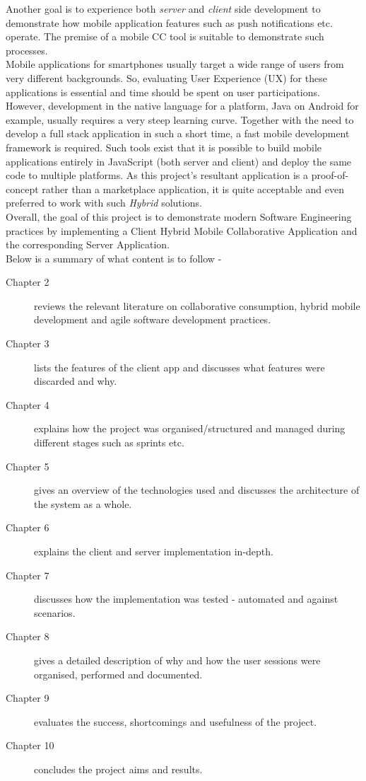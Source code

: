 Another goal is to experience both \textit{server} and \textit{client} side development to demonstrate how mobile application features such as push notifications etc. operate. The premise of a mobile CC tool is suitable to demonstrate such processes.\\

Mobile applications for smartphones usually target a wide range of users from very different backgrounds. So, evaluating User Experience (UX) for these applications is essential and time should be spent on user participations. However, development in the native language for a platform, Java on Android for example, usually requires a very steep learning curve. Together with the need to develop a full stack application in such a short time, a fast mobile development framework is required. Such tools exist that it is possible to build mobile applications entirely in JavaScript (both server and client) and deploy the same code to multiple platforms. As this project's resultant application is a proof-of-concept rather than a marketplace application, it is quite acceptable and even preferred to work with such \textit{Hybrid} solutions.\\

Overall, the goal of this project is to demonstrate modern Software Engineering practices by implementing a Client Hybrid Mobile Collaborative Application and the corresponding Server Application.\\

Below is a summary of what content is to follow -

\begin{description}
	\item [Chapter 2] reviews the relevant literature on collaborative consumption, hybrid mobile development and agile software development practices.
	\item [Chapter 3] lists the features of the client app and discusses what features were discarded and why.
	\item [Chapter 4] explains how the project was organised/structured and managed during different stages such as sprints etc.
	\item [Chapter 5] gives an overview of the technologies used and discusses the architecture of the system as a whole.
	\item [Chapter 6] explains the client and server implementation in-depth.
	\item [Chapter 7] discusses how the implementation was tested - automated and against scenarios.
	\item [Chapter 8] gives a detailed description of why and how the user sessions were organised, performed and documented.
	\item [Chapter 9] evaluates the success, shortcomings and usefulness of the project.
	\item [Chapter 10] concludes the project aims and results.
\end{description}